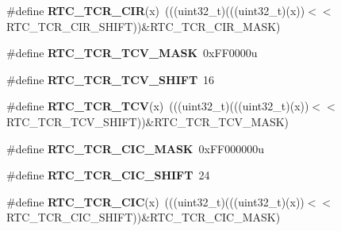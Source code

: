 \begin{DoxyCompactItemize}
\item 
\mbox{\label{group___r_t_c___register___masks_ga2425cc5a6f775938d0c0aa5448b96b05}} 
\#define {\bfseries R\+T\+C\+\_\+\+T\+C\+R\+\_\+\+C\+IR}(x)~(((uint32\+\_\+t)(((uint32\+\_\+t)(x))$<$$<$R\+T\+C\+\_\+\+T\+C\+R\+\_\+\+C\+I\+R\+\_\+\+S\+H\+I\+FT))\&R\+T\+C\+\_\+\+T\+C\+R\+\_\+\+C\+I\+R\+\_\+\+M\+A\+SK)
\item 
\mbox{\label{group___r_t_c___register___masks_ga920f92da02ac0a6ae0931645600e2405}} 
\#define {\bfseries R\+T\+C\+\_\+\+T\+C\+R\+\_\+\+T\+C\+V\+\_\+\+M\+A\+SK}~0x\+F\+F0000u
\item 
\mbox{\label{group___r_t_c___register___masks_ga6bcbafe57cdb430da5ee6902e0bcb224}} 
\#define {\bfseries R\+T\+C\+\_\+\+T\+C\+R\+\_\+\+T\+C\+V\+\_\+\+S\+H\+I\+FT}~16
\item 
\mbox{\label{group___r_t_c___register___masks_gaa8994c74539b06641e723be00af76459}} 
\#define {\bfseries R\+T\+C\+\_\+\+T\+C\+R\+\_\+\+T\+CV}(x)~(((uint32\+\_\+t)(((uint32\+\_\+t)(x))$<$$<$R\+T\+C\+\_\+\+T\+C\+R\+\_\+\+T\+C\+V\+\_\+\+S\+H\+I\+FT))\&R\+T\+C\+\_\+\+T\+C\+R\+\_\+\+T\+C\+V\+\_\+\+M\+A\+SK)
\item 
\mbox{\label{group___r_t_c___register___masks_ga788e49f72c48b3c98794b49e27337c64}} 
\#define {\bfseries R\+T\+C\+\_\+\+T\+C\+R\+\_\+\+C\+I\+C\+\_\+\+M\+A\+SK}~0x\+F\+F000000u
\item 
\mbox{\label{group___r_t_c___register___masks_ga84c801695fa1e344e7b2c8e6568cb7c8}} 
\#define {\bfseries R\+T\+C\+\_\+\+T\+C\+R\+\_\+\+C\+I\+C\+\_\+\+S\+H\+I\+FT}~24
\item 
\mbox{\label{group___r_t_c___register___masks_ga650d1b34ad6d46090befda0296b4fe3f}} 
\#define {\bfseries R\+T\+C\+\_\+\+T\+C\+R\+\_\+\+C\+IC}(x)~(((uint32\+\_\+t)(((uint32\+\_\+t)(x))$<$$<$R\+T\+C\+\_\+\+T\+C\+R\+\_\+\+C\+I\+C\+\_\+\+S\+H\+I\+FT))\&R\+T\+C\+\_\+\+T\+C\+R\+\_\+\+C\+I\+C\+\_\+\+M\+A\+SK)
\item 
\mbox{\label{group___r_t_c___register___masks_ga114a670a6ac2782bd777ea33e4395059}} 
$$
\end{DoxyCompactItemize}
